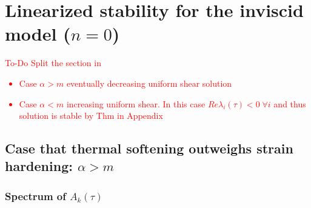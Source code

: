 \documentclass[a4paper,11pt]{article}
\newcommand{\tcr}{\textcolor{red}}
\theoremstyle{remark}
\begin{document}
%


\section{Linearized stability for the inviscid model ($n=0$)} \label{sec:Hadamard}

\tcr{To-Do  Split the section in 
\begin{itemize}
\item Case $\alpha > m$ eventually decreasing uniform shear solution
\item Case $\alpha < m$ increasing uniform shear.
In this case $Re \lambda_i (\tau ) < 0 \; \forall i$ and thus solution is stable by Thm in Appendix
\end{itemize}
}




\subsection{Case that thermal softening outweighs strain hardening: $\alpha > m$}


\subsubsection{Spectrum of $A_k(\tau)$}
\end{document}
